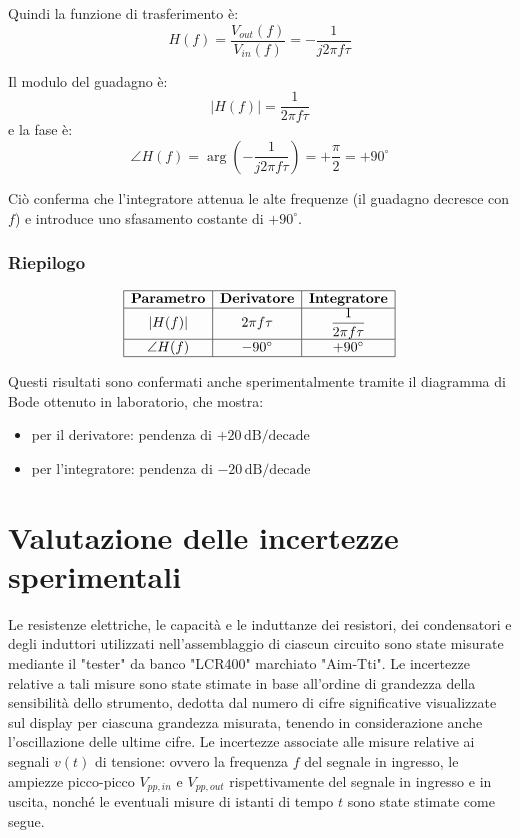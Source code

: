 \documentclass[a4paper,12pt]{article}
\begin{document}
Quindi la funzione di trasferimento è:
\[
H(f) = \frac{V_{out}(f)}{V_{in}(f)} = -\frac{1}{j 2 \pi f \tau}
\]

Il modulo del guadagno è:
\[
|H(f)| = \frac{1}{2 \pi f \tau}
\]
e la fase è:
\[
\angle H(f) = \arg\left(-\frac{1}{j 2 \pi f \tau}\right) = +\frac{\pi}{2} = +90^\circ
\]

Ciò conferma che l’integratore attenua le alte frequenze (il guadagno decresce con \( f \)) e introduce uno sfasamento costante di \( +90^\circ \).

\subsubsection*{Riepilogo}

\[
\begin{array}{|c|c|c|}
\hline
\textbf{Parametro} & \textbf{Derivatore} & \textbf{Integratore} \\
\hline
|H(f)| & 2 \pi f \tau & \dfrac{1}{2 \pi f \tau} \\
\hline
\angle H(f) & -90^\circ & +90^\circ \\
\hline
\end{array}
\]

Questi risultati sono confermati anche sperimentalmente tramite il diagramma di Bode ottenuto in laboratorio, che mostra:
\begin{itemize}
    \item per il derivatore: pendenza di \( +20 \, \text{dB/decade} \)
    \item per l’integratore: pendenza di \( -20 \, \text{dB/decade} \)
\end{itemize}



\section{Valutazione delle incertezze sperimentali}
Le resistenze elettriche, le capacità e le induttanze dei resistori, dei condensatori e degli induttori utilizzati nell’assemblaggio di ciascun circuito sono state misurate mediante il "tester" da banco "LCR400" marchiato "Aim-Tti". Le incertezze relative a tali misure sono state stimate in base all’ordine di grandezza della sensibilità dello strumento, dedotta dal numero di cifre significative visualizzate sul display per ciascuna grandezza misurata, tenendo in considerazione anche l'oscillazione delle ultime cifre.
Le incertezze associate alle misure relative ai segnali $v(t)$ di tensione: ovvero la frequenza $f$ del segnale in ingresso, le ampiezze picco-picco $V_{pp,in}$ e $V_{pp,out}$ rispettivamente del segnale in ingresso e in uscita, nonché le eventuali misure di istanti di tempo $t$ sono state stimate come segue.
\end{document}
